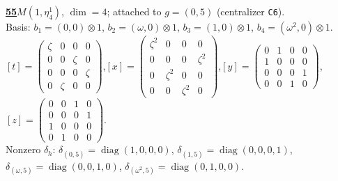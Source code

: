 \begin{samepage}\noindent\textbf{\underline{55}}\quad $M(1,\eta^{1}_{4})$, $\dim=4$; attached to $g=(0,5)$ (centralizer \texttt{C6}).\\
Basis: $b_{1}=(0,0)\otimes 1$, $b_{2}=(\omega,0)\otimes 1$, $b_{3}=(1,0)\otimes 1$, $b_{4}=(\omega^2,0)\otimes 1$.\\
$[t]=\left(\begin{smallmatrix} \zeta & 0 & 0 & 0 \\ 0 & 0 & \zeta & 0 \\ 0 & 0 & 0 & \zeta \\ 0 & \zeta & 0 & 0 \end{smallmatrix}\right)$,\quad $[x]=\left(\begin{smallmatrix} \zeta^2 & 0 & 0 & 0 \\ 0 & 0 & 0 & \zeta^2 \\ 0 & \zeta^2 & 0 & 0 \\ 0 & 0 & \zeta^2 & 0 \end{smallmatrix}\right)$,\quad $[y]=\left(\begin{smallmatrix} 0 & 1 & 0 & 0 \\ 1 & 0 & 0 & 0 \\ 0 & 0 & 0 & 1 \\ 0 & 0 & 1 & 0 \end{smallmatrix}\right)$,\quad $[z]=\left(\begin{smallmatrix} 0 & 0 & 1 & 0 \\ 0 & 0 & 0 & 1 \\ 1 & 0 & 0 & 0 \\ 0 & 1 & 0 & 0 \end{smallmatrix}\right)$.\\
Nonzero $\delta_h$: $\delta_{(0,5)}=\operatorname{diag}(1,0,0,0)$, $\delta_{(1,5)}=\operatorname{diag}(0,0,0,1)$, $\delta_{(\omega,5)}=\operatorname{diag}(0,0,1,0)$, $\delta_{(\omega^2,5)}=\operatorname{diag}(0,1,0,0)$.\end{samepage}
\medskip

